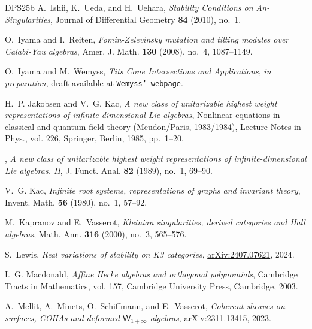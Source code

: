 \documentclass[reqno,a4paper]{amsart}
\theoremstyle{basic-theorem}
\numberwithin{equation}{section}
\begin{document}
\begin{thebibliography}{DPS{\etalchar{+}}25b}
	A.~Ishii, K.~Ueda, and H.~Uehara, \textit{Stability {{Conditions}} on
		{{An-Singularities}}}, Journal of Differential Geometry \textbf{84} (2010),
	no.~1.
	
	O.~Iyama and I.~Reiten, \textit{Fomin-{Z}elevinsky mutation and tilting modules
		over {C}alabi-{Y}au algebras}, Amer. J. Math. \textbf{130} (2008), no.~4,
	1087--1149.
		
	O.~Iyama and M.~Wemyss, \textit{Tits {C}one {I}ntersections and {A}pplications},
	\textit{in preparation}, draft available at
	\href{https://www.maths.gla.ac.uk/~mwemyss/MainFile_for_web.pdf}{\texttt{Wemyss'
			webpage}}.
	
	H.~P. Jakobsen and V.~G. Kac, \textit{A new class of unitarizable highest weight
		representations of infinite-dimensional {L}ie algebras}, Nonlinear equations
	in classical and quantum field theory ({M}eudon/{P}aris, 1983/1984), Lecture
	Notes in Phys., vol. 226, Springer, Berlin, 1985, pp.~1--20.
	
	\bysame, \textit{A new class of unitarizable highest weight representations of
		infinite-dimensional {L}ie algebras. {II}}, J. Funct. Anal. \textbf{82}
	(1989), no.~1, 69--90.
	
	V.~G. Kac, \textit{Infinite root systems, representations of graphs and invariant
		theory}, Invent. Math. \textbf{56} (1980), no.~1, 57--92.
	
	M.~Kapranov and E.~Vasserot, \textit{Kleinian singularities, derived categories
		and {H}all algebras}, Math. Ann. \textbf{316} (2000), no.~3, 565--576.
	
	S.~Lewis, \textit{Real variations of stability on {K}3 categories},
	\href{http://arxiv.org/abs/2407.07621}{\sf arXiv:2407.07621}, 2024.
	
	I.~G. Macdonald, \textit{Affine {H}ecke algebras and orthogonal polynomials},
	Cambridge Tracts in Mathematics, vol. 157, Cambridge University Press,
	Cambridge, 2003.
	
	A.~Mellit, A.~Minets, O.~Schiffmann, and E.~Vasserot, \textit{Coherent sheaves on
		surfaces, {COHA}s and deformed $\mathsf{W}_{1+\infty}$-algebras},
	\href{http://arxiv.org/abs/2311.13415}{\sf arXiv:2311.13415}, 2023.
	

\end{thebibliography}
\end{document}
